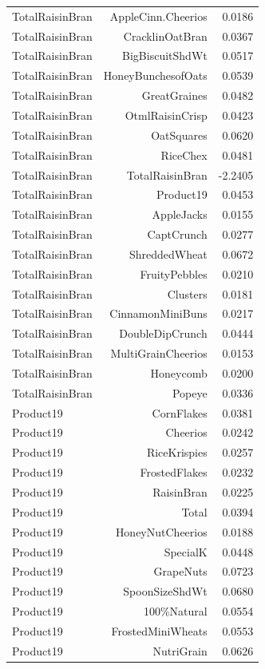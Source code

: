 \begin{longtable}{@{}lrr@{}}
TotalRaisinBran & AppleCinn.Cheerios & 0.0186 \\
TotalRaisinBran & CracklinOatBran & 0.0367 \\
TotalRaisinBran & BigBiscuitShdWt & 0.0517 \\
TotalRaisinBran & HoneyBunchesofOats & 0.0539 \\
TotalRaisinBran & GreatGraines & 0.0482 \\
TotalRaisinBran & OtmlRaisinCrisp & 0.0423 \\
TotalRaisinBran & OatSquares & 0.0620 \\
TotalRaisinBran & RiceChex & 0.0481 \\
TotalRaisinBran & TotalRaisinBran & -2.2405 \\
TotalRaisinBran & Product19 & 0.0453 \\
TotalRaisinBran & AppleJacks & 0.0155 \\
TotalRaisinBran & CaptCrunch & 0.0277 \\
TotalRaisinBran & ShreddedWheat & 0.0672 \\
TotalRaisinBran & FruityPebbles & 0.0210 \\
TotalRaisinBran & Clusters & 0.0181 \\
TotalRaisinBran & CinnamonMiniBuns & 0.0217 \\
TotalRaisinBran & DoubleDipCrunch & 0.0444 \\
TotalRaisinBran & MultiGrainCheerios & 0.0153 \\
TotalRaisinBran & Honeycomb & 0.0200 \\
TotalRaisinBran & Popeye & 0.0336 \\
Product19 & CornFlakes & 0.0381 \\
Product19 & Cheerios & 0.0242 \\
Product19 & RiceKrispies & 0.0257 \\
Product19 & FrostedFlakes & 0.0232 \\
Product19 & RaisinBran & 0.0225 \\
Product19 & Total & 0.0394 \\
Product19 & HoneyNutCheerios & 0.0188 \\
Product19 & SpecialK & 0.0448 \\
Product19 & GrapeNuts & 0.0723 \\
Product19 & SpoonSizeShdWt & 0.0680 \\
Product19 & 100\%Natural & 0.0554 \\
Product19 & FrostedMiniWheats & 0.0553 \\
Product19 & NutriGrain & 0.0626 \\

\end{longtable}
